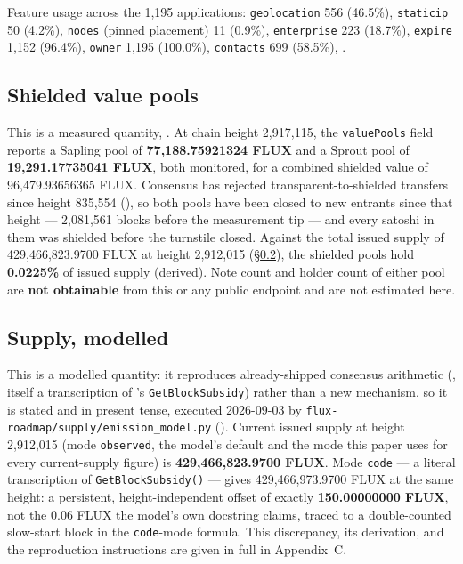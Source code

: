 Feature usage across the 1,195 applications: \texttt{geolocation} 556 (46.5\%), \texttt{staticip}
50 (4.2\%), \texttt{nodes} (pinned placement) 11 (0.9\%), \texttt{enterprise} 223 (18.7\%),
\texttt{expire} 1,152 (96.4\%), \texttt{owner} 1,195 (100.0\%), \texttt{contacts} 699 (58.5\%),
\shipped {}.

\subsection{Shielded value pools}
\label{sec:eval-shielded}

This is a measured quantity, \shipped {}.
At chain height 2,917,115, the \texttt{valuePools} field reports a Sapling pool of
\textbf{77,188.75921324 FLUX} and a Sprout pool of \textbf{19,291.17735041 FLUX}, both monitored,
for a combined shielded value of 96,479.93656365 FLUX. Consensus has rejected transparent-to-shielded
transfers since height 835,554 (), so both pools have been
closed to new entrants since that height — 2,081,561 blocks before the measurement tip — and every
satoshi in them was shielded before the turnstile closed. Against the total issued supply of
429,466,823.9700 FLUX at height 2,912,015 (\S\ref{sec:eval-supply}), the shielded pools hold
\textbf{0.0225\%} of issued supply (derived). Note count and holder count of either pool are
\textbf{not obtainable} from this or any public endpoint and are not estimated here.

\subsection{Supply, modelled}
\label{sec:eval-supply}

This is a modelled quantity: it reproduces already-shipped \PoN consensus arithmetic
(, itself a transcription of
\PoN's \texttt{Get\allowbreak{}Block\allowbreak{}Subsidy}) rather than a new mechanism, so it is stated \shipped and in
present tense, executed 2026-09-03 by \texttt{flux-\allowbreak{}roadmap/\allowbreak{}supply/\allowbreak{}emission\_model.\allowbreak{}py}
(). Current issued supply at height
2,912,015 (mode \texttt{observed}, the model's default and the mode this paper uses for every
current-supply figure) is \textbf{429,466,823.9700 FLUX}. Mode \texttt{code} — a literal
transcription of \texttt{Get\allowbreak{}Block\allowbreak{}Subsidy()} — gives 429,466,973.9700 FLUX at the same height: a
persistent, height-independent offset of exactly \textbf{150.00000000 FLUX}, not the 0.06 FLUX the
model's own docstring claims, traced to a double-counted slow-start block in the \texttt{code}-mode
formula. This discrepancy, its derivation, and the reproduction instructions are given in full in
Appendix~C.

